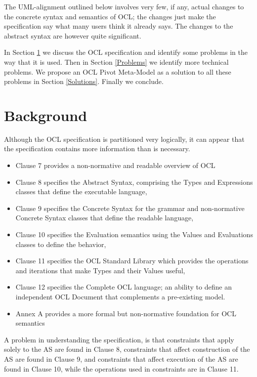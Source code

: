\documentclass{eceasst}
\begin{document}
The UML-alignment outlined below involves very few, if any, actual changes to the concrete syntax and semantics of OCL; the changes just make the specification say what many users think it already says. The changes to the abstract syntax are however quite significant.

In Section \ref{Background} we discuss the OCL specification and identify some problems in the way that it is used. Then in Section \ref{Problems} we  identify more technical problems. We propose an OCL Pivot Meta-Model as a solution to all these problems in Section \ref{Solutions}. Finally we conclude. 

\section{Background}\label{Background}

Although the OCL specification is partitioned very logically, it can appear that the specification contains more information than is necessary.

\begin{itemize}
\item Clause 7 provides a non-normative and readable overview of OCL
\item Clause 8 specifies the Abstract Syntax, comprising the Types and Expressions classes that define the executable language, 
\item Clause 9 specifies the Concrete Syntax for the grammar and non-normative Concrete Syntax classes that define the readable language, 
\item Clause 10 specifies the Evaluation semantics using the Values and Evaluations classes to define the behavior, 
\item Clause 11 specifies the OCL Standard Library which provides the operations and iterations that make Types and their Values useful, 
\item Clause 12 specifies the Complete OCL language; an ability to define an independent OCL Document that complements a pre-existing model.
\item Annex A provides a more formal but non-normative foundation for OCL semantics
\end{itemize}

A problem in understanding the specification, is that constraints that apply solely to the AS are found in Clause 8, constraints that affect construction of the AS are found in Clause 9, and constraints that affect execution of the AS are found in Clause 10, while the operations used in constraints are in Clause 11.
\end{document}
